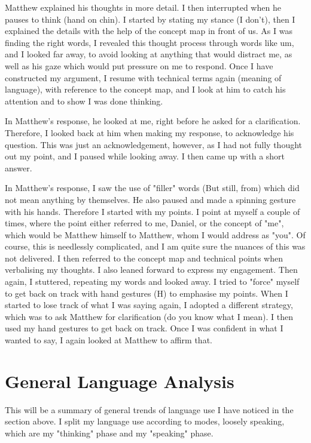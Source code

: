 \documentclass[12pt]{article}
\begin{document}
Matthew explained his thoughts in more detail. I then interrupted when he pauses to think (hand on chin). I started by stating my stance (I don't), then I explained the details with the help of the concept map in front of us. As I was finding the right words, I revealed this thought process through words like um, and I looked far away, to avoid looking at anything that would distract me, as well as his gaze which would put pressure on me to respond. Once I have constructed my argument, I resume with technical terms again (meaning of language), with reference to the concept map, and I look at him to catch his attention and to show I was done thinking.

In Matthew's response, he looked at me, right before he asked for a clarification. Therefore, I looked back at him when making my response, to acknowledge his question. This was just an acknowledgement, however, as I had not fully thought out my point, and I paused while looking away. I then came up with a short answer.

In Matthew's response, I saw the use of "filler" words (But still, from) which did not mean anything by themselves. He also paused and made a spinning gesture with his hands. Therefore I started with my points. I point at myself a couple of times, where the point either referred to me, Daniel, or the concept of "me", which would be Matthew himself to Matthew, whom I would address as "you". Of course, this is needlessly complicated, and I am quite sure the nuances of this was not delivered. I then referred to the concept map and technical points when verbalising my thoughts. I also leaned forward to express my engagement. Then again, I stuttered, repeating my words and looked away. I tried to "force" myself to get back on track with hand gestures (H) to emphasise my points. When I started to lose track of what I was saying again, I adopted a different strategy, which was to ask Matthew for clarification (do you know what I mean). I then used my hand gestures to get back on track. Once I was confident in what I wanted to say, I again looked at Matthew to affirm that.

\section{General Language Analysis}

This will be a summary of general trends of language use I have noticed in the section above. I split my language use according to modes, loosely speaking, which are my "thinking" phase and my "speaking" phase.
\end{document}
